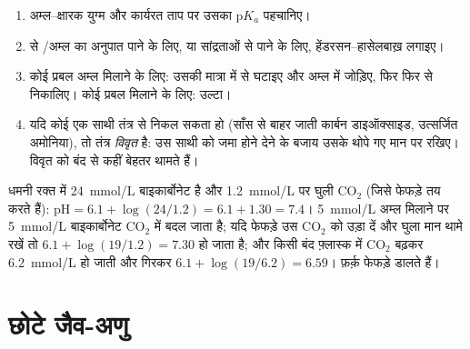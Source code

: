 \begin{method}[बफ़र का अंकगणित]\label{met:b1:water-small-molecules:bufferarith}
\begin{enumerate}
  \item अम्ल--क्षारक युग्म और कार्यरत ताप पर उसका p$K_a$ पहचानिए।
  \item {} से /अम्ल का अनुपात पाने के लिए, या सांद्रताओं से 
        पाने के लिए, हेंडरसन--हासेलबाख़ लगाइए।
  \item कोई प्रबल अम्ल मिलाने के लिए: उसकी मात्रा  में से घटाइए
        और अम्ल में जोड़िए, फिर  फिर से निकालिए। कोई प्रबल 
        मिलाने के लिए: उल्टा।
  \item यदि कोई एक साथी तंत्र से निकल सकता हो (साँस से बाहर जाती कार्बन
        डाइऑक्साइड, उत्सर्जित अमोनिया), तो तंत्र \emph{विवृत} है: उस
        साथी को जमा होने देने के बजाय उसके थोपे गए मान पर रखिए। विवृत
          को बंद  से कहीं बेहतर थामते हैं।
\end{enumerate}
\end{method}

\begin{example}[रक्त]\label{ex:b1:water-small-molecules:blood}
धमनी रक्त में \qty{24}{mmol/L} बाइकार्बोनेट है और \qty{1.2}{mmol/L} पर
घुली $\mathrm{CO_2}$ (जिसे फेफड़े तय करते हैं): $\mathrm{pH} =
6.1 + \log(24/1.2) = 6.1 + 1.30 = 7.4$। \qty{5}{mmol/L} अम्ल मिलाने पर
\qty{5}{mmol/L} बाइकार्बोनेट $\mathrm{CO_2}$ में बदल जाता है; यदि फेफड़े
उस $\mathrm{CO_2}$ को उड़ा दें और घुला मान थामे रखें तो 
$6.1 + \log(19/1.2) = 7.30$ हो जाता है; और किसी बंद फ़्लास्क में
$\mathrm{CO_2}$ बढ़कर \qty{6.2}{mmol/L} हो जाती और  गिरकर
$6.1 + \log(19/6.2) =
6.59$। फ़र्क़ फेफड़े डालते हैं।
\end{example}

\section{छोटे जैव-अणु}

